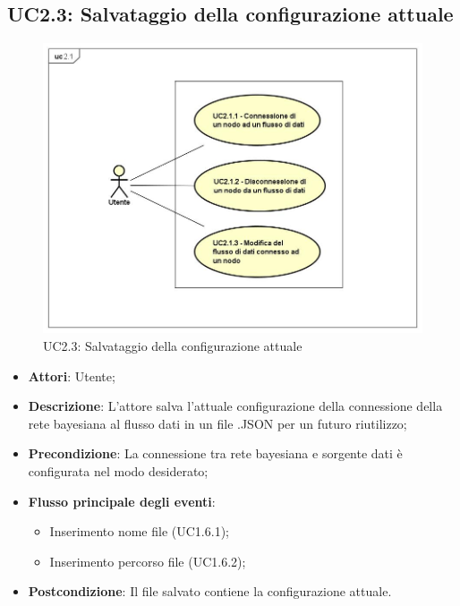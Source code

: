 \subsection{UC2.3: Salvataggio della configurazione attuale}
\begin{figure} [H]
	\centering
	\includegraphics[scale=0.45]{Img/UC2-1}
	\caption{UC2.3: Salvataggio della configurazione attuale}\label{}
\end{figure}
\begin{itemize}
	\item \textbf{Attori}: Utente;
	\item \textbf{Descrizione}: L'attore salva l'attuale configurazione della connessione della rete bayesiana al flusso dati in un file .JSON per un futuro riutilizzo;
	\item \textbf{Precondizione}: La connessione tra rete bayesiana e sorgente dati è configurata nel modo desiderato;
	\item \textbf{Flusso principale degli eventi}:
	\begin{itemize}
		\item Inserimento nome file (UC1.6.1);
		\item Inserimento percorso file (UC1.6.2);
	\end{itemize}
	\item \textbf{Postcondizione}: Il file salvato contiene la configurazione attuale.
\end{itemize}

